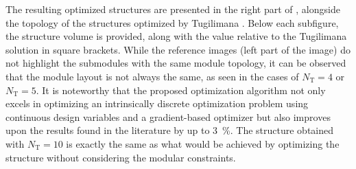 The resulting optimized structures are presented in the right part of , alongside the topology of the structures optimized by Tugilimana \etal \cite{tugilimana_integrated_2019}. Below each subfigure, the structure volume is provided, along with the value relative to the Tugilimana solution in square brackets. While the reference images (left part of the image) do not highlight the submodules with the same module topology, it can be observed that the module layout is not always the same, as seen in the cases of $N_\text{T}=4$ or $N_\text{T}=5$. It is noteworthy that the proposed optimization algorithm not only excels in optimizing an intrinsically discrete optimization problem using continuous design variables and a gradient-based optimizer but also improves upon the results found in the literature by up to \qty{3}{\percent}. The structure obtained with $N_\text{T}=10$ is exactly the same as what would be achieved by optimizing the structure without considering the modular constraints.

